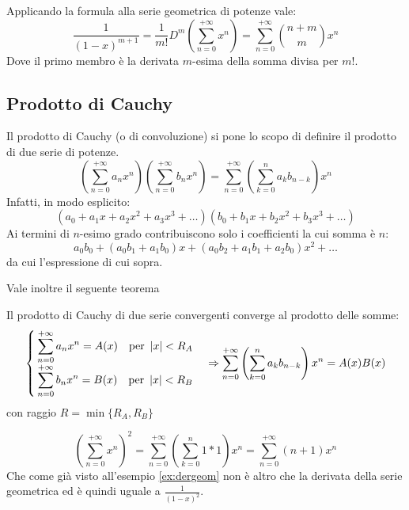 Applicando la formula alla serie geometrica di potenze vale:
\[
	\frac{1}{(1-x)^{m+1}}=\frac{1}{m!}D^m\left(\sum_{n=0}^{+\infty}x^n\right)=\sum_{n=0}^{+\infty}\binom{n+m}{m}x^n
\]
Dove il primo membro è la derivata $m$-esima della somma divisa per $m!$.


\subsection{Prodotto di Cauchy}
Il prodotto di Cauchy (o di convoluzione) si pone lo scopo di definire il prodotto di due serie di potenze.
\[
	\left(\sum_{n=0}^{+\infty} a_nx^n\right)\left(\sum_{n=0}^{+\infty}b_nx^n\right)=\sum_{n=0}^{+\infty}\left(\sum_{k=0}^na_kb_{n-k}\right)x^n
\]
Infatti, in modo esplicito:
\[
	(a_0+a_1x+a_2x^2+a_3x^3+\dots)(b_0+b_1x+b_2x^2+b_3x^3+\dots)
\]
Ai termini di $n$-esimo grado contribuiscono solo i coefficienti la cui somma è $n$:
\[
	a_0b_0+(a_0b_1+a_1b_0)x+(a_0b_2+a_1b_1+a_2b_0)x^2+\dots
\]
da cui l'espressione di cui sopra.

Vale inoltre il seguente teorema
\begin{teor}
	Il prodotto di Cauchy di due serie convergenti converge al prodotto delle somme:
	\[
		\begin{cases}
			\displaystyle\sum_{n=0}^{+\infty}a_nx^n=A(x)\quad\text{per }\left\lvert x \right\rvert<R_A \\[2ex]
			\displaystyle\sum_{n=0}^{+\infty}b_nx^n=B(x)\quad\text{per }\left\lvert x \right\rvert<R_B
		\end{cases}\Rightarrow
		\sum_{n=0}^{+\infty}\left(\sum_{k=0}^na_kb_{n-k}\right)x^n=A(x)B(x)
	\]
	con raggio $R=\min\{R_A,R_B\}$
\end{teor}
\begin{examp}
	\[
		\left(\sum_{n=0}^{+\infty}x^n\right)^2=\sum_{n=0}^{+\infty}\left(\sum_{k=0}^n 1*1\right)x^n=\sum_{n=0}^{+\infty}(n+1)x^n
	\]
	Che come già visto all'esempio \ref{ex:dergeom} non è altro che la derivata della serie geometrica ed è quindi uguale a $\frac{1}{(1-x)^2}$.
\end{examp}

